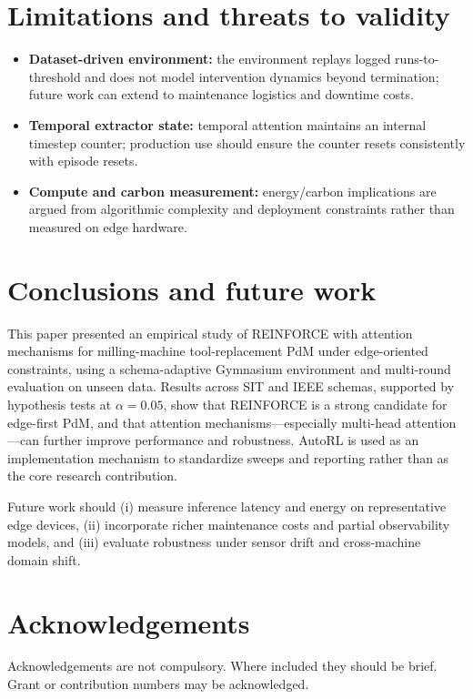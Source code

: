 \documentclass[sn-basic]{sn-jnl} %
\begin{document}
\section{Limitations and threats to validity}
\label{sec:limits}
\begin{itemize}
        \item \textbf{Dataset-driven environment:} the environment replays logged runs-to-threshold and does not model intervention dynamics beyond termination; future work can extend to maintenance logistics and downtime costs.
        \item \textbf{Temporal extractor state:} temporal attention maintains an internal timestep counter; production use should ensure the counter resets consistently with episode resets.
        \item \textbf{Compute and carbon measurement:} energy/carbon implications are argued from algorithmic complexity and deployment constraints rather than measured on edge hardware.
\end{itemize}

\section{Conclusions and future work}
\label{sec:conclusion}
This paper presented an empirical study of \textsc{REINFORCE} with attention mechanisms for milling-machine tool-replacement PdM under edge-oriented constraints, using a schema-adaptive Gymnasium environment and multi-round evaluation on unseen data. Results across SIT and IEEE schemas, supported by hypothesis tests at $\alpha=0.05$, show that \textsc{REINFORCE} is a strong candidate for edge-first PdM, and that attention mechanisms---especially multi-head attention---can further improve performance and robustness. AutoRL is used as an implementation mechanism to standardize sweeps and reporting rather than as the core research contribution.

Future work should (i) measure inference latency and energy on representative edge devices, (ii) incorporate richer maintenance costs and partial observability models, and (iii) evaluate robustness under sensor drift and cross-machine domain shift.



\section*{Acknowledgements}

Acknowledgements are not compulsory. Where included they should be brief. Grant or contribution numbers may be acknowledged.
\end{document}
